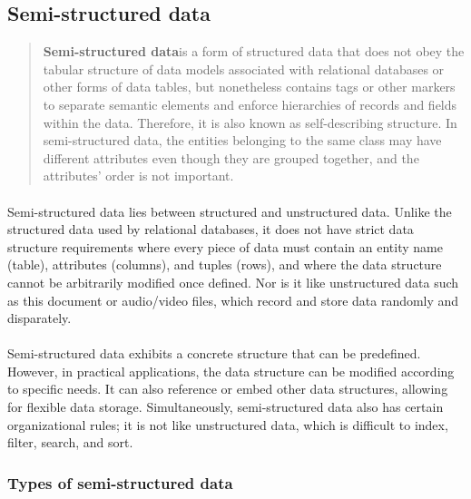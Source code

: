 \documentclass{article}
\begin{document}
\subsection{Semi-structured data}

\begin{quote}
    \textbf{Semi-structured data}\footnotemark[1] is a form of structured data that does not obey the tabular structure of data models associated with relational databases or other forms of data tables, but nonetheless contains tags or other markers to separate semantic elements and enforce hierarchies of records and fields within the data. Therefore, it is also known as self-describing structure.
		In semi-structured data, the entities belonging to the same class may have different attributes even though they are grouped together, and the attributes' order is not important.
\end{quote}

\paragraph{} Semi-structured data lies between structured and unstructured data. Unlike the structured data used by relational databases, it does not have strict data structure requirements where every piece of data must contain an entity name (table), attributes (columns), and tuples (rows), and where the data structure cannot be arbitrarily modified once defined. Nor is it like unstructured data such as this document or audio/video files, which record and store data randomly and disparately.

\paragraph{} Semi-structured data exhibits a concrete structure that can be predefined. However, in practical applications, the data structure can be modified according to specific needs. It can also reference or embed other data structures, allowing for flexible data storage. Simultaneously, semi-structured data also has certain organizational rules; it is not like unstructured data, which is difficult to index, filter, search, and sort.

\subsubsection{Types of semi-structured data}
\end{document}
